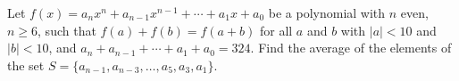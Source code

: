Let $f(x)=a_nx^n+a_{n-1}x^{n-1}+\cdots+a_1x+a_0$ be a polynomial with $n$ even, $n\ge6$, such that $f(a)+f(b)=f(a+b)$ for all $a$ and $b$ with $|a|<10$ and $|b|<10$, and $a_n+a_{n-1}+\cdots+a_1+a_0=324$. Find the average of the elements of the set $S=\{a_{n-1},a_{n-3},\dots,a_5,a_3,a_1\}$.
